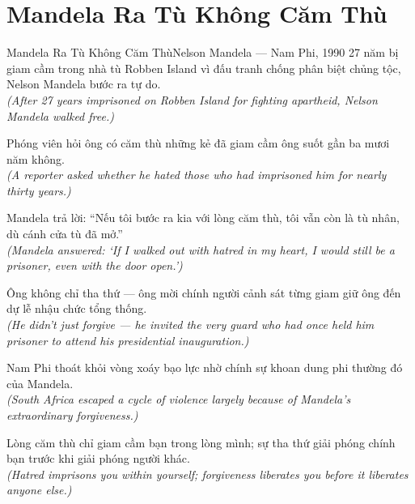 \section{Mandela Ra Tù Không Căm Thù}
\begin{truyen}{Mandela Ra Tù Không Căm Thù}{Nelson Mandela --- Nam Phi, 1990}
 27 năm bị giam cầm trong nhà tù Robben Island vì đấu tranh chống phân biệt chủng tộc, Nelson Mandela bước ra tự do.\\[4pt]
\textit{(After 27 years imprisoned on Robben Island for fighting apartheid, Nelson Mandela walked free.)}

Phóng viên hỏi ông có căm thù những kẻ đã giam cầm ông suốt gần ba mươi năm không.\\[4pt]
\textit{(A reporter asked whether he hated those who had imprisoned him for nearly thirty years.)}

Mandela trả lời: ``Nếu tôi bước ra kia với lòng căm thù, tôi vẫn còn là tù nhân, dù cánh cửa tù đã mở.''\\[4pt]
\textit{(Mandela answered: `If I walked out with hatred in my heart, I would still be a prisoner, even with the door open.')}

Ông không chỉ tha thứ --- ông mời chính người cảnh sát từng giam giữ ông đến dự lễ nhậu chức tổng thống.\\[4pt]
\textit{(He didn't just forgive --- he invited the very guard who had once held him prisoner to attend his presidential inauguration.)}

Nam Phi thoát khỏi vòng xoáy bạo lực nhờ chính sự khoan dung phi thường đó của Mandela.\\[4pt]
\textit{(South Africa escaped a cycle of violence largely because of Mandela's extraordinary forgiveness.)}

\end{truyen}
\begin{baihoc}
  Lòng căm thù chỉ giam cầm bạn trong lòng mình; sự tha thứ giải phóng chính bạn trước khi giải phóng người khác.\\[4pt]
  \textit{(Hatred imprisons you within yourself; forgiveness liberates you before it liberates anyone else.)}
\end{baihoc}

